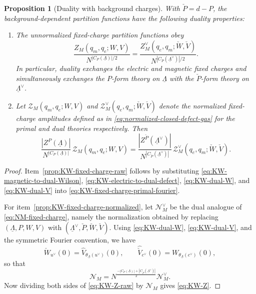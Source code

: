 \documentclass[dvipsnames,a4paper]{article}
\numberwithin{equation}{section}
\newtheorem{prop}[theorem]{Proposition}
\theoremstyle{definition}
\theoremstyle{remark}
\begin{document}
\begin{prop}[Duality with background charges]
	\label{prop:KW-fixed-charge-duality}
	With \(\check P=d-P\), the background-dependent partition functions have the following duality properties:
	\begin{enumerate}[label=(\roman*)]
		\item\label{prop:KW-fixed-charge-raw}
		The unnormalized fixed-charge partition functions obey
		\begin{equation}
			\frac{Z_M(q_m,q_e;W,V)}{N^{|C_P(\underline\Lambda)|/2}}
			= \frac{Z_M^\vee(q_e,q_m;\check W,\check V)}{N^{|C_{\check P}(\underline\Lambda^\vee)|/2}}.
			\label{eq:KW-Z-raw}
		\end{equation}
		In particular, duality exchanges the electric and magnetic fixed charges and
		simultaneously exchanges the \(P\)-form theory on \(\underline\Lambda\) with the
		\(\check P\)-form theory on \(\underline\Lambda^\vee\).
		
		\item\label{prop:KW-fixed-charge-normalized}
		Let \(\mathcal Z_M(q_m,q_e;W,V)\) and
		\(\mathcal Z_M^\vee(q_e,q_m;\check W,\check V)\) denote the normalized
		fixed-charge amplitudes defined as in \eqref{eq:normalized-closed-defect-gas} for
		the primal and dual theories respectively. Then
		\begin{equation}
			\frac{|Z^P(\underline\Lambda)|}{N^{|C_P(\underline\Lambda)|}}\,
			\mathcal Z_M(q_m,q_e;W,V)
			=
			\frac{|Z^{\check P}(\underline\Lambda^\vee)|}
			{N^{|C_{\check P}(\underline\Lambda^\vee)|}}\,
			\mathcal Z_M^\vee(q_e,q_m;\check W,\check V).
			\label{eq:KW-Z}
		\end{equation}
	\end{enumerate}
\end{prop}

\begin{proof}
	Item~\ref{prop:KW-fixed-charge-raw} follows by substituting
	\eqref{eq:KW-magnetic-to-dual-Wilson},
	\eqref{eq:KW-electric-to-dual-defect}, \eqref{eq:KW-dual-W}, and
	\eqref{eq:KW-dual-V} into \eqref{eq:KW-fixed-charge-primal-fourier}.
	
	For item~\ref{prop:KW-fixed-charge-normalized}, let \(\mathcal N_M^\vee\) be the
	dual analogue of \eqref{eq:NM-fixed-charge}, namely the normalization obtained by
	replacing \((\underline\Lambda,P,W,V)\) with
	\((\underline\Lambda^\vee,\check P,\check W,\check V)\). Using
	\eqref{eq:KW-dual-W}, \eqref{eq:KW-dual-V}, and the symmetric Fourier convention,
	we have
	\begin{equation}
		\check W_{u^\vee}(0)=\widehat V_{\theta_{\underline\Lambda}(u^\vee)}(0),
		\qquad
		\widehat{\check V}_{c^\vee}(0)=W_{\theta_{\underline\Lambda}(c^\vee)}(0),
	\end{equation}
	so that
	\begin{equation}
		\mathcal N_M
		=
		N^{\frac{-|C_P(\underline\Lambda)|+|C_{\check P}(\underline\Lambda^\vee)|}{2}}
		\mathcal N_M^\vee.
		\label{eq:Ndual}
	\end{equation}
	Now dividing both sides of \eqref{eq:KW-Z-raw} by \(\mathcal N_M\) gives \eqref{eq:KW-Z}.
\end{proof}
\end{document}
